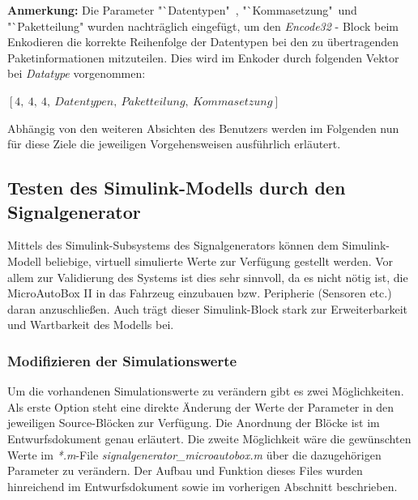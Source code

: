 \documentclass[fontsize = 12pt, paper = a4]{scrreprt}
\begin{document}
\newpage

\textbf{Anmerkung:} Die Parameter "`Datentypen"\ , "`Kommasetzung"\ und "`Paketteilung" wurden nachträglich eingefügt, um den \textit{Encode32} - Block beim Enkodieren die korrekte Reihenfolge der Datentypen bei den zu übertragenden Paketinformationen mitzuteilen. Dies wird im Enkoder durch folgenden Vektor bei \textit{Datatype} vorgenommen: 

\begin{center}
$[ 4, \ 4, \ 4, \ Datentypen, \ Paketteilung, \ Kommasetzung ]$ 
\end{center}


 



Abhängig von den weiteren Absichten des Benutzers werden im Folgenden nun für diese Ziele die jeweiligen Vorgehensweisen ausführlich erläutert. 

\subsection{Testen des Simulink-Modells durch den Signalgenerator}

Mittels des Simulink-Subsystems des Signalgenerators können dem Simulink-Modell beliebige, virtuell simulierte Werte zur Verfügung gestellt werden. Vor allem zur Validierung des Systems ist dies sehr sinnvoll, da es nicht nötig ist, die MicroAutoBox II in das Fahrzeug einzubauen bzw. Peripherie (Sensoren etc.) daran anzuschließen. Auch trägt dieser Simulink-Block stark zur Erweiterbarkeit und Wartbarkeit des Modells bei.  

\subsubsection{Modifizieren der Simulationswerte}

Um die vorhandenen Simulationswerte zu verändern gibt es zwei Möglichkeiten. 
Als erste Option steht eine direkte Änderung der Werte  der Parameter in den jeweiligen Source-Blöcken zur Verfügung. 
Die Anordnung der Blöcke ist im Entwurfsdokument genau erläutert. 
Die zweite Möglichkeit wäre die gewünschten Werte im \textit{*.m}-File \textit{signalgenerator\_microautobox.m} über die dazugehörigen Parameter zu verändern. 
Der Aufbau und Funktion dieses Files wurden hinreichend im Entwurfsdokument sowie im vorherigen Abschnitt beschrieben.
\end{document}
